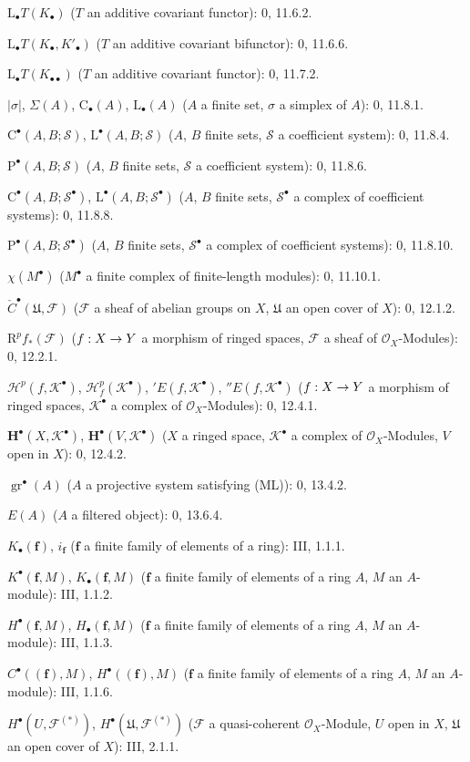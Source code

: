 \documentclass[oneside]{amsart}
\theoremstyle{ega-env-style}
\theoremstyle{ega-thm-env-style}
\theoremstyle{ega-defn-env-style}
\def\mathcal{\mathscr}
\def\sh{\mathcal}                   %
\def\RR{\mathrm{R}}                 %
\def\LL{\mathrm{L}}                 %
\renewcommand{\to}{\mathchoice{\longrightarrow}{\rightarrow}{\rightarrow}{\rightarrow}}
\begin{document}
\begin{flushleft}
$\LL_\bullet T(K_\bullet)$ ($T$ an additive covariant functor): 0, 11.6.2.

$\LL_\bullet T(K_\bullet,K'_\bullet)$ ($T$ an additive covariant
bifunctor): 0, 11.6.6.

$\LL_\bullet T(K_{\bullet\bullet})$ ($T$ an additive covariant functor):
0, 11.7.2.

$|\sigma|$, $\Sigma(A)$, $\mathrm C_\bullet(A)$, $\mathrm L_\bullet(A)$
($A$ a finite set, $\sigma$ a simplex of $A$): 0, 11.8.1.

$\mathrm C^\bullet(A,B;\sh{S})$, $\mathrm L^\bullet(A,B;\sh{S})$
($A$, $B$ finite sets, $\sh{S}$ a coefficient system): 0, 11.8.4.

$\mathrm P^\bullet(A,B;\sh{S})$ ($A$, $B$ finite sets, $\sh{S}$ a
coefficient system): 0, 11.8.6.

$\mathrm C^\bullet(A,B;\sh{S}^\bullet)$,
$\mathrm L^\bullet(A,B;\sh{S}^\bullet)$ ($A$, $B$ finite sets,
$\sh{S}^\bullet$ a complex of coefficient systems): 0, 11.8.8.

$\mathrm P^\bullet(A,B;\sh{S}^\bullet)$ ($A$, $B$ finite sets,
$\sh{S}^\bullet$ a complex of coefficient systems): 0, 11.8.10.

$\chi(M^\bullet)$ ($M^\bullet$ a finite complex of finite-length modules):
0, 11.10.1.

$\check C^\bullet(\mathfrak U,\sh{F})$ ($\sh{F}$ a sheaf of abelian groups
on $X$, $\mathfrak U$ an open cover of $X$): 0, 12.1.2.

$\RR^p f_*(\sh{F})$ ($f:X\to Y$ a morphism of ringed spaces,
$\sh{F}$ a sheaf of $\sh{O}_X$-Modules): 0, 12.2.1.

$\sh{H}^p(f,\sh{K}^\bullet)$,
$\sh{H}^p_f(\sh{K}^\bullet)$, ${}'E(f,\sh{K}^\bullet)$,
${}''E(f,\sh{K}^\bullet)$ ($f:X\to Y$ a morphism of ringed spaces,
$\sh{K}^\bullet$ a complex of $\sh{O}_X$-Modules): 0, 12.4.1.

$\mathbf H^\bullet(X,\sh{K}^\bullet)$,
$\mathbf H^\bullet(V,\sh{K}^\bullet)$ ($X$ a ringed space,
$\sh{K}^\bullet$ a complex of $\sh{O}_X$-Modules, $V$ open in $X$):
0, 12.4.2.

$\operatorname{gr}^\bullet(A)$ ($A$ a projective system satisfying (ML)):
0, 13.4.2.

$E(A)$ ($A$ a filtered object): 0, 13.6.4.

$K_\bullet(\mathbf f)$, $i_{\mathbf f}$ ($\mathbf f$ a finite family of
elements of a ring): III, 1.1.1.

$K^\bullet(\mathbf f,M)$, $K_\bullet(\mathbf f,M)$ ($\mathbf f$ a finite
family of elements of a ring $A$, $M$ an $A$-module): III, 1.1.2.

$H^\bullet(\mathbf f,M)$, $H_\bullet(\mathbf f,M)$ ($\mathbf f$ a finite
family of elements of a ring $A$, $M$ an $A$-module): III, 1.1.3.

$C^\bullet((\mathbf f),M)$, $H^\bullet((\mathbf f),M)$ ($\mathbf f$ a
finite family of elements of a ring $A$, $M$ an $A$-module): III, 1.1.6.

$H^\bullet(U,\sh{F}^{(*)})$,
$H^\bullet(\mathfrak U,\sh{F}^{(*)})$ ($\sh{F}$ a quasi-coherent
$\sh{O}_X$-Module, $U$ open in $X$, $\mathfrak U$ an open cover of $X$):
III, 2.1.1.
\end{flushleft}
\end{document}
